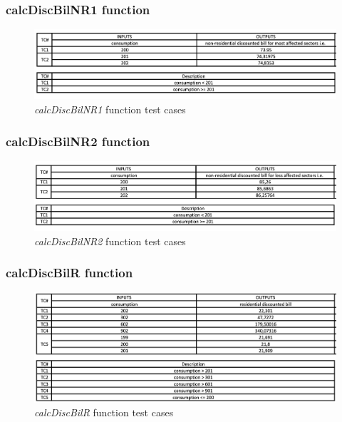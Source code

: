 \documentclass{article}
\begin{document}
    \subsubsection{calcDiscBilNR1 function}

    \begin{figure}[h!]
        \includegraphics[width=0.8\linewidth, center]{unit_tests/calcDiscBilNR1.png}
        \caption{\textit{calcDiscBilNR1} function test cases}
        \label{fig:calcDiscBilNR1}
    \end{figure}

    \subsubsection{calcDiscBilNR2 function}

    \begin{figure}[h!]
        \includegraphics[width=0.8\linewidth, center]{unit_tests/calcDiscBilNR2.png}
        \caption{\textit{calcDiscBilNR2} function test cases}
        \label{fig:calcDiscBilNR2}
    \end{figure}

    \newpage

    \subsubsection{calcDiscBilR function}

    \begin{figure}[h!]
        \includegraphics[width=0.8\linewidth, center]{unit_tests/calcDiscBilR.png}
        \caption{\textit{calcDiscBilR} function test cases}
        \label{fig:calcDiscBilR}
    \end{figure}
\end{document}

